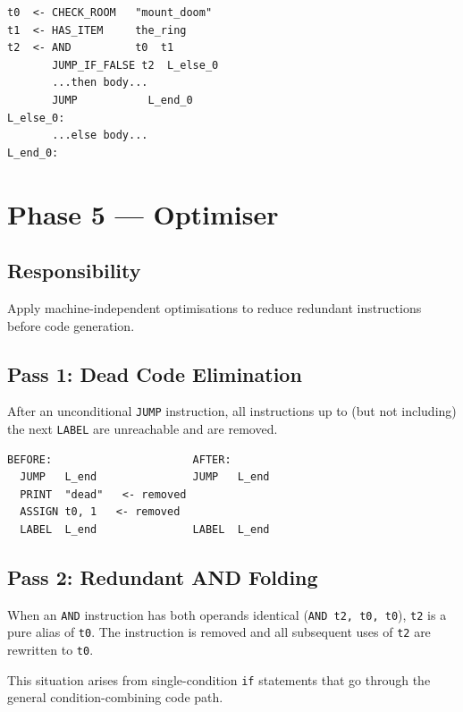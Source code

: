 \documentclass[12pt, a4paper]{article}
\begin{document}
\begin{lstlisting}[language={}, basicstyle=\ttfamily\small, frame=single,
    backgroundcolor=\color{code-bg}]
t0  <- CHECK_ROOM   "mount_doom"
t1  <- HAS_ITEM     the_ring
t2  <- AND          t0  t1
       JUMP_IF_FALSE t2  L_else_0
       ...then body...
       JUMP           L_end_0
L_else_0:
       ...else body...
L_end_0:
\end{lstlisting}

\section{Phase 5 --- Optimiser}

\subsection{Responsibility}
Apply machine-independent optimisations to reduce redundant instructions before
code generation.

\subsection{Pass 1: Dead Code Elimination}

After an unconditional \texttt{JUMP} instruction, all instructions up to (but not
including) the next \texttt{LABEL} are unreachable and are removed.

\begin{lstlisting}[language={}, basicstyle=\ttfamily\small, frame=single,
    backgroundcolor=\color{code-bg}, caption={Dead code elimination}]
BEFORE:                      AFTER:
  JUMP   L_end               JUMP   L_end
  PRINT  "dead"   <- removed
  ASSIGN t0, 1   <- removed
  LABEL  L_end               LABEL  L_end
\end{lstlisting}

\subsection{Pass 2: Redundant AND Folding}

When an \texttt{AND} instruction has both operands identical
(\texttt{AND t2, t0, t0}), \texttt{t2} is a pure alias of \texttt{t0}.
The instruction is removed and all subsequent uses of \texttt{t2} are rewritten
to \texttt{t0}.

This situation arises from single-condition \texttt{if} statements that go through
the general condition-combining code path.
\end{document}
